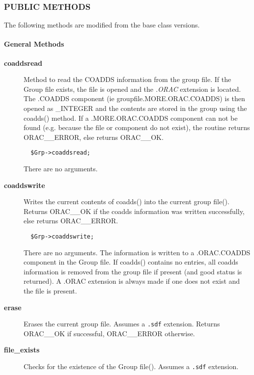 \subsubsection*{PUBLIC METHODS\label{ORAC::Group::NDF_PUBLIC_METHODS}}


The following methods are modified from the base class versions.

\paragraph*{General Methods\label{ORAC::Group::NDF_General_Methods}}
\begin{description}

\item[\textbf{coaddsread}] \mbox{}

Method to read the COADDS information from the group file. If the
Group file exists, the file is opened and the \emph{.ORAC} extension is
located. The .COADDS component (ie groupfile.MORE.ORAC.COADDS) is then
opened as \_INTEGER and the contents are stored in the group using the
coadds() method. If a .MORE.ORAC.COADDS component can not be found (e.g.
because the file or component do not exist), the routine returns
ORAC\_\_ERROR, else returns ORAC\_\_OK.

\begin{verbatim}
  $Grp->coaddsread;
\end{verbatim}


There are no arguments.


\item[\textbf{coaddswrite}] \mbox{}

Writes the current contents of coadds() into the current group file().
Returns ORAC\_\_OK if the coadds information was written successfully,
else returns ORAC\_\_ERROR.

\begin{verbatim}
  $Grp->coaddswrite;
\end{verbatim}


There are no arguments. The information is written to a .ORAC.COADDS
component in the Group file.  If coadds() contains no entries, all
coadds information is removed from the group file if present (and good
status is returned). A .ORAC extension is always made if one does not
exist and the file is present.


\item[\textbf{erase}] \mbox{}

Erases the current group file. Assumes a \texttt{.sdf} extension.
Returns ORAC\_\_OK if successful, ORAC\_\_ERROR otherwise.


\item[\textbf{file\_exists}] \mbox{}

Checks for the existence of the Group file(). Assumes a \texttt{.sdf}
extension.

\end{description}
